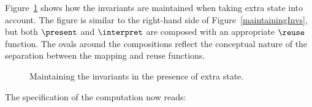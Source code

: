 Figure~\ref{maintainExtraState} shows how the invariants are maintained when taking extra state into account. The figure is similar to the right-hand side of Figure~\ref{maintainingInvs}, but both $\present$ and
 $\interpret$ are composed with an appropriate $\reuse$ function. The ovals around the compositions reflect the conceptual nature of the separation between the mapping and reuse functions. 

\begin{figure}
\begin{center}
\begin{center}
\end{center}
\caption{Maintaining the invariants in the presence of extra state.}\label{maintainExtraState} 
\end{center}
\end{figure}



The specification of the computation now reads: 

